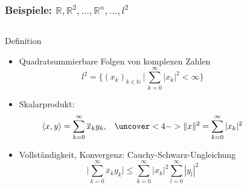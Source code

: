 %
%
%
\bgroup
\begin{frame}[t]
\setlength{\abovedisplayskip}{5pt}
\setlength{\belowdisplayskip}{5pt}
\frametitle{Beispiele: $\mathbb{R},\mathbb{R}^2,\dots,\mathbb{R}^n,\dots,l^2$}
\vspace{-20pt}
\begin{columns}[t,onlytextwidth]
\begin{column}{0.48\textwidth}
\begin{block}{Definition}
\begin{itemize}
\item<2-> Quadratsummierbare Folgen von komplexen Zahlen
\[
l^2
=
\biggl\{
(x_k)_{k\in\mathbb{N}}\,\bigg|\, \sum_{k=0}^\infty |x_k|^2 < \infty
\biggr\}
\]
\item<3-> Skalarprodukt:
\begin{align*}
\langle x,y\rangle
&=
\sum_{k=0}^\infty \overline{x}_ky_k,
&
\uncover<4->{\|x\|^2 = \sum_{k=0}^\infty |x_k|^2}
\end{align*}
\item<5-> Vollständigkeit,
Konvergenz: Cauchy-Schwarz-Ungleichung
\[
\biggl|
\sum_{k=0}^\infty \overline{x}_ky_k
\biggr|
\le
\sum_{k=0}^\infty |x_k|^2
\sum_{l=0}^\infty |y_l|^2
\]
\end{itemize}
\end{block}
\end{column}
\begin{column}{0.48\textwidth}
\vspace{-16pt}
\end{column}
\end{columns}
\end{frame}
\egroup
